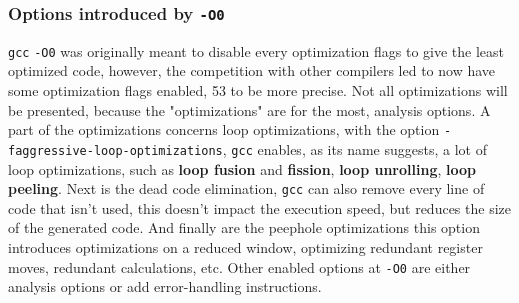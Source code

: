 \documentclass{rapport}
\newcommand{\gcc}{\texttt{gcc} }
\newcommand{\optizero}{\texttt{-O0} }
\begin{document}
\subsubsection{Options introduced by \optizero}
\gcc \optizero was originally meant to disable every optimization flags to give the least optimized code, however, the competition with other compilers led to 
now have some optimization flags enabled, 53 to be more precise. Not all optimizations will be presented, because the "optimizations" are for the most, analysis
options.
\newline
A part of the optimizations concerns loop optimizations, with the option \newline \texttt{-faggressive-loop-optimizations}, \gcc enables, as its name suggests, a lot of loop optimizations, 
such as \textbf{loop fusion} and \textbf{fission}, \textbf{loop unrolling}, \textbf{loop peeling}. \newline
Next is the dead code elimination, \gcc can also remove every line of code that isn't used, this doesn't impact the execution speed, but reduces the size of the generated code.\newline
And finally are the peephole optimizations this option introduces optimizations on a reduced window, optimizing redundant register moves, redundant calculations, etc.
\newline
Other enabled options at \optizero are either analysis options or add error-handling instructions.
\end{document}
